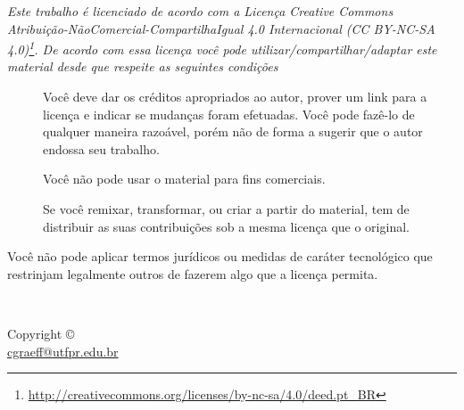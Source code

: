 \begin{center}
\Huge\ccbyncsa
\end{center}
{\it
Este trabalho é licenciado de acordo com a Licença Creative Commons  Atribuição-NãoComercial-CompartilhaIgual 4.0 Internacional  (CC BY-NC-SA 4.0)\footnote{\url{http://creativecommons.org/licenses/by-nc-sa/4.0/deed.pt_BR}}. De acordo com essa licença você pode utilizar/compartilhar/adaptar este material desde que respeite as seguintes condições
\begin{description}
	\item[\ccAttribution]Você deve dar os créditos apropriados ao autor, prover um link para a licença e indicar se mudanças foram efetuadas. Você pode fazê-lo de qualquer maneira razoável, porém não de forma a sugerir que o autor endossa seu trabalho.

    \item[\ccNonCommercial]Você não pode usar o material para fins comerciais.

    \item[\ccShareAlike]Se você remixar, transformar, ou criar a partir do material, tem de distribuir as suas contribuições sob a mesma licença que o original.
\end{description}
Você não pode aplicar termos jurídicos ou medidas de caráter tecnológico que restrinjam legalmente outros de fazerem algo que a licença permita.
}
%
~\vfill
\begin{fullwidth}
\thispagestyle{empty}
\setlength{\parindent}{0pt}
\setlength{\parskip}{\baselineskip}
Copyright \copyright\ \the\year\ \thanklessauthor\\
\url{cgraeff@utfpr.edu.br}

\par\textit{\monthyear}
\end{fullwidth}
